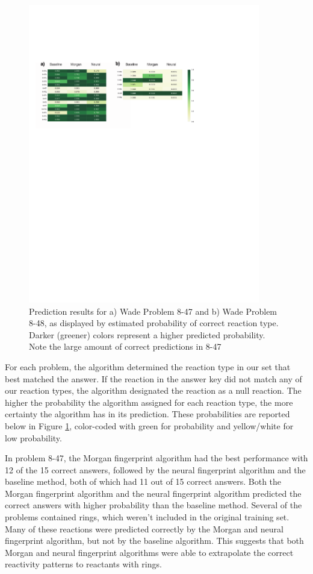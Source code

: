 \begin{figure}
\begin{center}
\includegraphics[trim=20 450 165 140,clip,width=0.9\textwidth]{results_heatmap}
\caption{\label{fig:Wade_results} Prediction results for a) Wade Problem 8-47 and b) Wade Problem 8-48, as displayed by estimated probability of correct reaction type. Darker (greener) colors represent a higher predicted probability. Note the large amount of correct predictions in 8-47}
\end{center}
\end{figure}


For each problem, the algorithm determined the reaction type in our set that best matched the answer. If the reaction in the answer key did not match any of our reaction types, the algorithm designated the reaction as a null reaction. The higher the probability the algorithm assigned for each reaction type, the more certainty the algorithm has in its prediction. These probabilities are reported below in Figure \ref{fig:Wade_results}, color-coded with green for probability and yellow/white for low probability. 

In problem 8-47, the Morgan fingerprint algorithm had the best performance with 12 of the 15 correct answers, followed by the neural fingerprint algorithm and the baseline method, both of which had 11 out of 15 correct answers. Both the Morgan fingerprint algorithm and the neural fingerprint algorithm predicted the correct answers with higher probability than the baseline method. Several of the problems contained rings, which weren't included in the original training set. Many of these reactions were predicted correctly by the Morgan and neural fingerprint algorithm, but not by the baseline algorithm. This suggests that both Morgan and neural fingerprint algorithms were able to extrapolate the correct reactivity patterns to reactants with rings.

